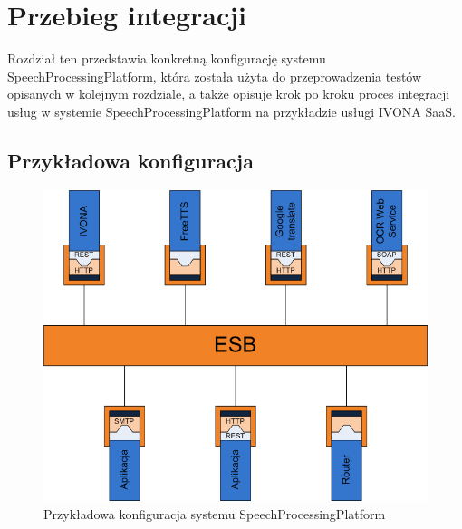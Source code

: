 

\chapter{Przebieg integracji} %



\ifpdf
    \graphicspath{{8/figures/PNG/}{8/figures/PDF/}{8/figures/}}
\else
    \graphicspath{{8/figures/EPS/}{8/figures/}}
\fi


Rozdział ten przedstawia konkretną konfigurację systemu SpeechProcessingPlatform, która została użyta do przeprowadzenia testów opisanych w kolejnym rozdziale, a także opisuje krok po kroku proces integracji usług w systemie SpeechProcessingPlatform na przykładzie usługi IVONA SaaS.
\section{Przykładowa konfiguracja}

\begin{figure}[!h]
	\centering
	\includegraphics[scale=0.6]{esb.png}
	\caption{Przykładowa konfiguracja  systemu SpeechProcessingPlatform}\label{fig:esb_configuration}
\end{figure}

